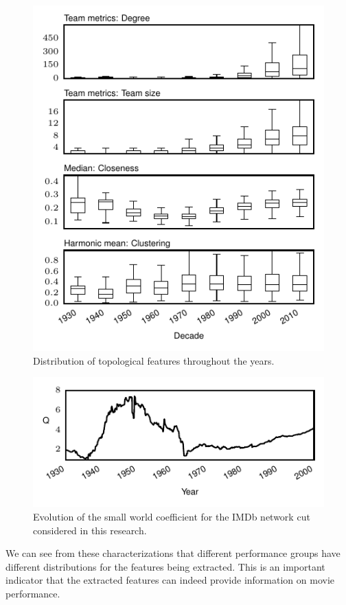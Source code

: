 \begin{figure}[!htb]\begin{center}
\includegraphics[width=0.78\columnwidth]{../../images/features_dist_top.pdf}
\caption{\label{fig:features_dist_top}Distribution of topological features
throughout the years.}
\end{center}\end{figure}

\begin{figure}[!htb]\begin{center}
\includegraphics[width=0.78\columnwidth]{../../images/plot_q_1k.pdf}
\caption{\label{fig:q}Evolution of the small world coefficient for the IMDb network
cut considered in this research.}
\end{center}\end{figure}

We can see from these characterizations that different performance groups have
different distributions for the features being extracted. This is an important
indicator that the extracted features can indeed provide information on movie
performance.


